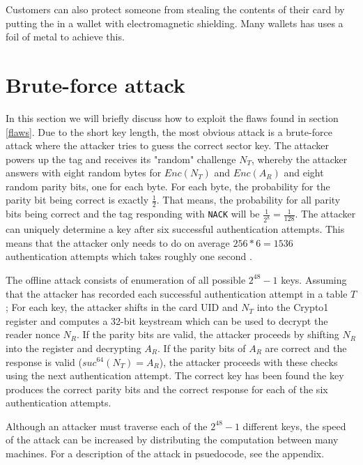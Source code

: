 \documentclass[10pt,twocolumn]{article}
\begin{document}
Customers can also protect someone from stealing the contents of their card by putting the in a wallet with electromagnetic shielding. Many wallets has uses a foil of metal to achieve this. 

\section{Brute-force attack}
\label{brute-force}
In this section we will briefly discuss how to exploit the flaws found in section \ref{flaws}. Due to the short key length, the most obvious attack is a brute-force attack where the attacker tries to guess the correct sector key. The attacker powers up the tag and receives its "random" challenge $N_T$, whereby the attacker answers with eight random bytes for $Enc(N_T)$ and $Enc(A_R)$ and eight random parity bits, one for each byte. For each byte, the probability for the parity bit being correct is exactly $\frac{1}{2}$. That means, the probability for all parity bits being correct and the tag responding with \verb!NACK! will be $\frac{1}{2^8}=\frac{1}{128}$. The attacker can uniquely determine a key after six successful authentication attempts. This means that the attacker only needs to do on average $256*6=1536$ authentication attempts which takes roughly one second \cite{garcia09}.

The offline attack consists of enumeration of all possible $2^{48}-1$ keys. Assuming that the attacker has recorded each successful authentication attempt in a table $T$; For each key, the attacker shifts in the card UID and $N_T$ into the Crypto1 register and computes a 32-bit keystream which can be used to decrypt the reader nonce $N_R$. If the parity bits are valid, the attacker proceeds by shifting $N_R$ into the register and decrypting $A_R$. If the parity bits of $A_R$ are correct and the response is valid ($suc^{64}(N_T)=A_R$), the attacker proceeds with these checks using the next authentication attempt. The correct key has been found the key produces the correct parity bits and the correct response for each of the six authentication attempts. 

Although an attacker must traverse each of the $2^{48}-1$ different keys, the speed of the attack can be increased by distributing the computation between many machines. For a description of the attack in psuedocode, see the appendix.
\end{document}
